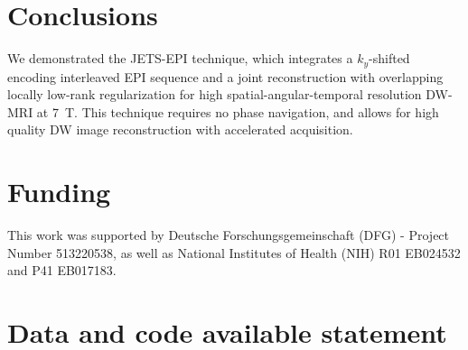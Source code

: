 \documentclass[preprint,12pt,authoryear,review]{elsarticle}
\begin{document}
	\section{Conclusions}
	\label{SEC:Conc}

	We demonstrated the JETS-EPI technique, which integrates
	a $k_y$-shifted encoding interleaved EPI sequence and
	a joint reconstruction with overlapping locally low-rank regularization
	for high spatial-angular-temporal resolution DW-MRI at \SI{7}{\tesla}.
	This technique requires no phase navigation,
        and allows for high quality DW image reconstruction with accelerated acquisition.


	\section*{Funding}

	This work was supported by Deutsche Forschungsgemeinschaft (DFG) - Project Number 513220538,
        as well as National Institutes of Health (NIH) R01 EB024532 and P41 EB017183.

	\section*{Data and code available statement}
\end{document}
